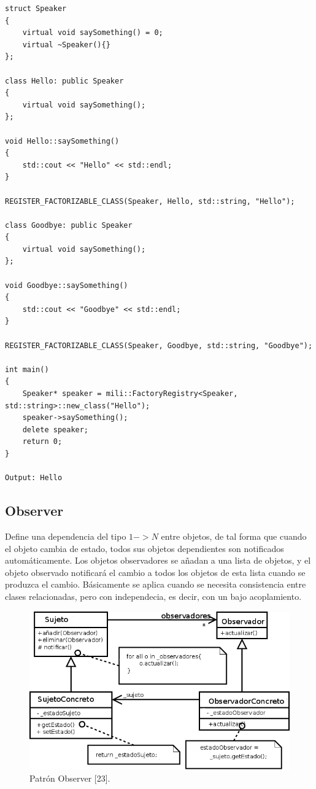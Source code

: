 \begin{verbatim}
struct Speaker
{
    virtual void saySomething() = 0;
    virtual ~Speaker(){}
};

class Hello: public Speaker
{
    virtual void saySomething();
};

void Hello::saySomething()
{
    std::cout << "Hello" << std::endl;
}

REGISTER_FACTORIZABLE_CLASS(Speaker, Hello, std::string, "Hello");

class Goodbye: public Speaker
{
    virtual void saySomething();
};

void Goodbye::saySomething()
{
    std::cout << "Goodbye" << std::endl;
}

REGISTER_FACTORIZABLE_CLASS(Speaker, Goodbye, std::string, "Goodbye");

int main()
{
	Speaker* speaker = mili::FactoryRegistry<Speaker, std::string>::new_class("Hello");
	speaker->saySomething();
	delete speaker;
	return 0;
}

Output: Hello
\end{verbatim}

\subsection{Observer}
\label{observer}
Define una dependencia del tipo $1->N$ entre objetos, de tal forma que cuando el objeto cambia de estado, todos sus objetos dependientes son notificados automáticamente. Los objetos observadores se añadan a una lista de objetos, y el objeto observado notificará el cambio a todos los objetos de esta lista cuando se produzca el cambio. Básicamente se aplica cuando se necesita consistencia entre clases relacionadas, pero con independecia, es decir, con un bajo acoplamiento. 

\begin{figure}[h!]
	\centering
		\includegraphics[scale=0.4]{image/observer.png}
	\caption{Patrón Observer [23].}
\end{figure} 	

